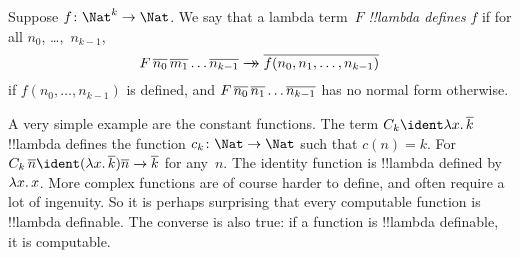 \documentclass[../../../include/open-logic-section]{subfiles}
\begin{document}
\begin{defn}
Suppose $f\colon \Nat^k \to \Nat$. We say that a lambda term~$F$
\emph{!!{lambda define}s} $f$ if for all 
$n_0$, \dots,~$n_{k-1}$,
\[
F \, \num{n_0} \, \num{m_1} \dots \num{n_{k-1}} \red \num{f(n_0, n_1, \dots,
  n_{k-1})}
\]
if $f(n_0, \dots, n_{k-1})$ is defined, and $F \, \overline{n_0} \,
\overline{n_1} \dots \overline{n_{k-1}}$ has no normal form otherwise.
\end{defn}

A very simple example are the constant functions. The term $C_k \ident
\lambd[x][\num{k}]$ !!{lambda define}s the function $c_k\colon \Nat \to
\Nat$ such that $c(n) = k$. For $C_k \, \num n \ident
(\lambd[x][\num{k}])\num n \redone \num{k}$ for any~$n$. The identity
function is !!{lambda defined} by $\lambd[x][x]$. More complex
functions are of course harder to define, and often require a lot of
ingenuity. So it is perhaps surprising that every computable function
is !!{lambda definable}. The converse is also true: if a function is
!!{lambda definable}, it is computable.
\end{document}
